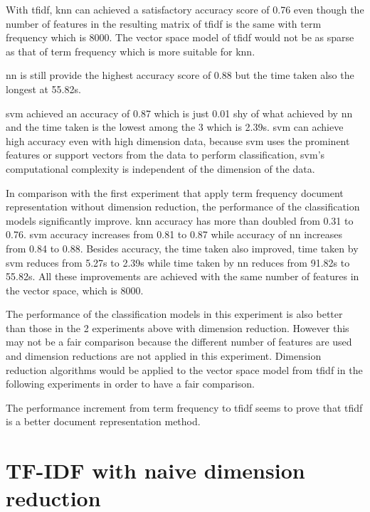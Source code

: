 With \ac{tfidf}, \ac{knn} can achieved a satisfactory accuracy score of 0.76 even though the number of features in the resulting matrix of \ac{tfidf} is the same with term frequency which is 8000. The vector space model of \ac{tfidf} would not be as sparse as that of term frequency which is more suitable for \ac{knn}.

\Ac{nn} is still provide the highest accuracy score of 0.88 but the time taken also the longest at 55.82s.

\Ac{svm} achieved an accuracy of 0.87 which is just 0.01 shy of what achieved by \ac{nn} and the time taken is the lowest among the 3 which is 2.39s. \Ac{svm} can achieve high accuracy even with high dimension data, because \ac{svm} uses the prominent features or support vectors from the data to perform classification, \ac{svm}'s computational complexity is independent of the dimension of the data. \cite{dimRedCat}

In comparison with the first experiment that apply term frequency document representation without dimension reduction, the performance of the classification models significantly improve. \Ac{knn} accuracy has more than doubled from 0.31 to 0.76. \Ac{svm} accuracy increases from 0.81 to 0.87 while accuracy of \ac{nn} increases from  0.84 to 0.88. Besides accuracy, the time taken also improved, time taken by \ac{svm} reduces from 5.27s to 2.39s while time taken by \ac{nn} reduces from 91.82s to 55.82s. All these improvements are achieved with the same number of features in the vector space, which is 8000. 

The performance of the classification models in this experiment is also better than those in the 2 experiments above with dimension reduction. However this may not be a fair comparison because the different number of features are used and dimension reductions are not applied in this experiment. Dimension reduction algorithms would be applied to the vector space model from \ac{tfidf} in the following experiments in order to have a fair comparison.

The performance increment from term frequency to \ac{tfidf} seems to prove that \ac{tfidf} is a better document representation method.\\

\section{TF-IDF with naive dimension reduction}

